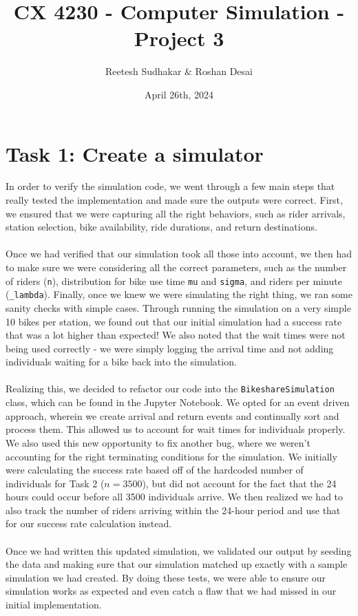 \documentclass{article}
\title{CX 4230 - Computer Simulation - Project 3}
\author{Reetesh Sudhakar \& Roshan Desai}
\date{April 26th, 2024}
\begin{document}
\maketitle

\section{Task 1: Create a simulator}
In order to verify the simulation code, we went through a few main steps that really tested the implementation and made sure the outputs were correct. First, we ensured that we were capturing all the right behaviors, such as rider arrivals, station selection, bike availability, ride durations, and return destinations. \\ \\
Once we had verified that our simulation took all those into account, we then had to make sure we were considering all the correct parameters, such as the number of riders ({\tt n}), distribution for bike use time {\tt mu} and {\tt sigma}, and riders per minute ({\tt \_lambda}). Finally, once we knew we were simulating the right thing, we ran some sanity checks with simple cases. Through running the simulation on a very simple 10 bikes per station, we found out that our initial simulation had a success rate that was a lot higher than expected! We also noted that the wait times were not being used correctly - we were simply logging the arrival time and not adding individuals waiting for a bike back into the simulation. \\ \\ 
Realizing this, we decided to refactor our code into the {\tt BikeshareSimulation} class, which can be found in the Jupyter Notebook. We opted for an event driven approach, wherein we create arrival and return events and continually sort and process them. This allowed us to account for wait times for individuals properly. We also used this new opportunity to fix another bug, where we weren't accounting for the right terminating conditions for the simulation. We initially were calculating the success rate based off of the hardcoded number of individuals for Task 2 ($n = 3500$), but did not account for the fact that the 24 hours could occur before all 3500 individuals arrive. We then realized we had to also track the number of riders arriving within the 24-hour period and use that for our success rate calculation instead. \\ \\ 
Once we had written this updated simulation, we validated our output by seeding the data and making sure that our simulation matched up exactly with a sample simulation we had created. By doing these tests, we were able to ensure our simulation works as expected and even catch a flaw that we had missed in our initial implementation.
\end{document}
